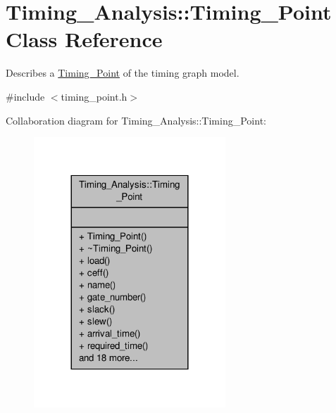 \hypertarget{classTiming__Analysis_1_1Timing__Point}{\section{Timing\-\_\-\-Analysis\-:\-:Timing\-\_\-\-Point Class Reference}
\label{classTiming__Analysis_1_1Timing__Point}
}


Describes a \hyperlink{classTiming__Analysis_1_1Timing__Point}{Timing\-\_\-\-Point} of the timing graph model.  




{\ttfamily \#include $<$timing\-\_\-point.\-h$>$}



Collaboration diagram for Timing\-\_\-\-Analysis\-:\-:Timing\-\_\-\-Point\-:\nopagebreak
\begin{figure}[H]
\begin{center}
\leavevmode
\includegraphics[width=204pt]{classTiming__Analysis_1_1Timing__Point__coll__graph}
\end{center}
\end{figure}
